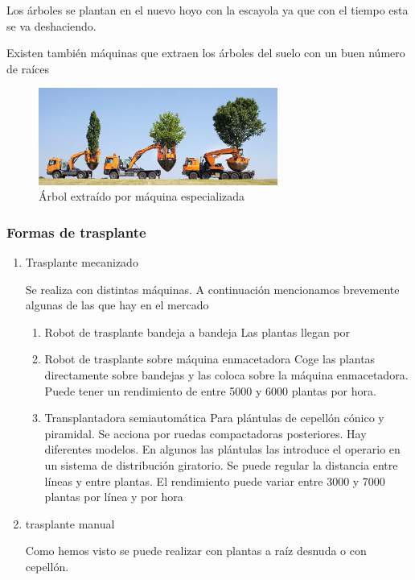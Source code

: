 \documentclass[a4paper,12pt,oneside]{article}
\begin{document}
\begin{enumerate}
\begin{enumerate}
Los árboles se plantan en el nuevo hoyo con la escayola ya que con el tiempo
esta se va deshaciendo.

Existen también máquinas que extraen los árboles del suelo con un buen número de
raíces  

\begin{figure}[htbp]
\centering
\includegraphics[width=0.7\textwidth]{./img_uf1596/arbol_transplante_maquina.jpg}
\caption{Árbol extraído por máquina especializada}
\end{figure}
\end{enumerate}
\end{enumerate}

\subsubsection{Formas de trasplante}
\label{sec:org5706484}

\begin{enumerate}
\item Trasplante mecanizado
\label{sec:orge3d2a45}

Se realiza con distintas máquinas. A continuación mencionamos brevemente algunas
de las que hay en el mercado

\begin{enumerate}
\item Robot de trasplante bandeja a bandeja
\label{sec:orgde58a6a}
Las plantas llegan por     
\item Robot de trasplante sobre máquina enmacetadora
\label{sec:org578be1a}
Coge las plantas directamente sobre bandejas y las coloca sobre la máquina enmacetadora. Puede tener un rendimiento de entre 5000 y 6000 plantas por hora.
\item Transplantadora semiautomática
\label{sec:org912585d}
Para plántulas de cepellón cónico y piramidal. Se acciona por ruedas compactadoras posteriores. Hay diferentes modelos. En algunos las plántulas las introduce el operario en un sistema de distribución giratorio. Se puede regular la distancia entre líneas y entre plantas. El rendimiento puede variar entre 3000 y 7000 plantas por línea y por hora
\end{enumerate}
\item trasplante manual
\label{sec:orgc674869}

Como hemos visto se puede realizar con plantas a raíz desnuda o con cepellón.
\end{enumerate}
\end{document}
